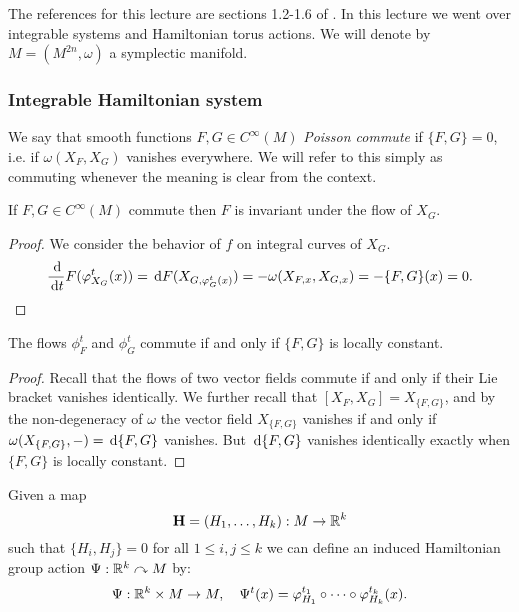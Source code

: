 The references for this lecture are sections 1.2-1.6 of \cite{Evans_2023}.
In this lecture we went over integrable systems and Hamiltonian torus actions.
We will denote by $M=(M^{2n},\omega)$ a symplectic manifold.

\subsubsection*{Integrable Hamiltonian system}

\begin{dfn}
    We say that smooth functions $F,G\in C^\infty(M)$ \emph{Poisson commute} if $\{F,G\}=0$, i.e. if $\omega(X_F,X_G)$ vanishes everywhere.
    We will refer to this simply as commuting whenever the meaning is clear from the context.
\end{dfn}

\begin{lem}
    If $F,G\in C^\infty(M)$ commute then $F$ is invariant under the flow of $X_G$.
\end{lem}

\begin{proof}
    We consider the behavior of $f$ on integral curves of $X_G$.
    \[\frac{\,\mathrm d}{\,\mathrm d t}F(\varphi_{X_G}^t(x))=\,\mathrm d F(X_{G,\varphi_G^t(x)})=-\omega(X_{F,x},X_{G,x})=-\{F,G\}(x)=0.\]
\end{proof}

\begin{lem}
    The flows $\phi_F^t$ and $\phi_G^t$ commute if and only if $\{F,G\}$ is locally constant.
\end{lem}

\begin{proof}
    Recall that the flows of two vector fields commute if and only if their Lie bracket vanishes identically.
    We further recall that $[X_F,X_G]=X_{\{F,G\}}$, and by the non-degeneracy of $\omega$ the vector field $X_{\{F,G\}}$ vanishes if and only if $\omega(X_{\{F,G\}},-)=\,\mathrm d\{F,G\}$ vanishes.
    But $\,\mathrm d\{F,G\}$ vanishes identically exactly when $\{F,G\}$ is locally constant.
\end{proof}

\begin{dfn}
    Given a map 
    \[\mathbf{H}=(H_1,\ldots,H_k):M\to\mathbb{R}^k\]
    such that $\{H_i,H_j\}=0$ for all $1\le i,j\le k$ we can define an induced Hamiltonian group action $\Psi:\mathbb{R}^k\curvearrowright M$ by:
    \[\Psi:\mathbb{R}^k\times M\to M,\quad \Psi^t(x)=\varphi_{H_1}^{t_1}\circ\cdots\circ\varphi_{H_k}^{t_k}(x).\]
\end{dfn}

